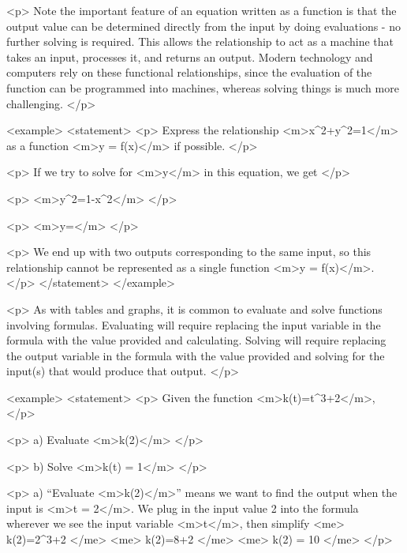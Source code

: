         <p>
            Note the important feature of an equation written as a function is that the output value can be determined directly from the input by doing evaluations - no further solving is required.
            This allows the relationship to act as a machine that takes an input, processes it, and returns an output.
            Modern technology and computers rely on these functional relationships, since the evaluation of the function can be programmed into machines, whereas solving things is much more challenging.
        </p>

        <example>
            <statement>
                <p>
                    Express the relationship <m>x^{2}+y^{2}=1</m> as a function <m>y = f(x)</m> if possible.
                </p>

                <p>
                    If we try to solve for <m>y</m> in this equation, we get
                </p>

                <p>
                    <m>y^{2}=1-x^{2}</m>
                </p>

                <p>
                    <m>y=\pm {}</m>
                </p>

                <p>
                    We end up with two outputs corresponding to the same input, so this relationship cannot be represented as a single function <m>y = f(x)</m>.
                </p>
            </statement>
        </example>

        <p>
            As with tables and graphs, it is common to evaluate and solve functions involving formulas.
            Evaluating will require replacing the input variable in the formula with the value provided and calculating.
            Solving will require replacing the output variable in the formula with the value provided and solving for the input(s) that would produce that output.
        </p>

        <example>
            <statement>
                <p>
                    Given the function <m>k(t)=t^{3}+2</m>,
                </p>

                <p>
                    a) Evaluate <m>k(2)</m>
                </p>

                <p>
                    b) Solve <m>k(t) = 1</m>
                </p>

                <p>
                    a) “Evaluate <m>k(2)</m>” means we want to find the output when the input is <m>t = 2</m>.
                    We plug in the input value 2 into the formula wherever we see the input variable <m>t</m>, then simplify
                    <me>
                        k(2)=2^{3}+2
                    </me>
                    <me>
                        k(2)=8+2
                    </me>
                    <me>
                        k(2) = 10
                    </me>
                </p>

